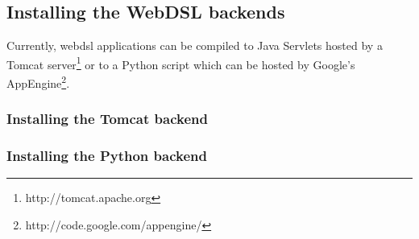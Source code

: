 \subsection[installbacked]{Installing the WebDSL backends}
Currently, webdsl applications can be compiled to Java Servlets hosted by a Tomcat server\footnote{http://tomcat.apache.org} or to a Python script which can be hosted by Google's AppEngine\footnote{http://code.google.com/appengine/}. 
\subsubsection{Installing the Tomcat backend}
\subsubsection{Installing the Python backend}
